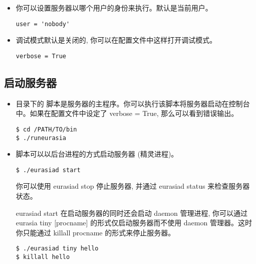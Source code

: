 \documentclass{manual}
\begin{document}
\begin{itemize}
\item {}

你可以设置服务器以哪个用户的身份来执行。默认是当前用户。

\begin{verbatim}
user = 'nobody'
\end{verbatim}


\item {}

调试模式默认是关闭的, 你可以在配置文件中这样打开调试模式。

\begin{verbatim}
verbose = True
\end{verbatim}

\end{itemize}

\subsection{启动服务器}

\begin{itemize}

\item {}

 目录下的  脚本是服务器的主程序。你可以执行该脚本将服务器启动在控制台中。如果在配置文件中设定了 verbose = True, 那么可以看到错误输出。

\begin{verbatim}
$ cd /PATH/TO/bin
$ ./runeurasia
\end{verbatim}


\item {}

 脚本可以以后台进程的方式启动服务器 (精灵进程)。

\begin{verbatim}
$ ./eurasiad start
\end{verbatim}

你可以使用 eurasiad stop 停止服务器, 并通过 eurasiad status 来检查服务器状态。

eurasiad start 在启动服务器的同时还会启动 daemon 管理进程, 你可以通过 eurasia tiny [procname] 的形式仅启动服务器而不使用 daemon 管理器。这时你只能通过 killall procname 的形式来停止服务器。

\begin{verbatim}
$ ./eurasiad tiny hello
$ killall hello
\end{verbatim}


\end{itemize}
\end{document}
